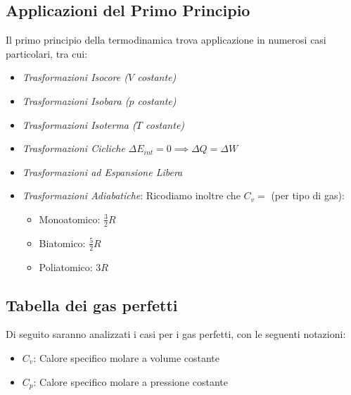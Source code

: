         \subsection*{Applicazioni del Primo Principio} Il primo principio della 
        termodinamica trova applicazione in numerosi casi particolari, tra cui:
            \begin{itemize}
                \item \textit{Trasformazioni Isocore ($V$ costante)}
                \item \textit{Trasformazioni Isobara ($p$ costante)}
                \item \textit{Trasformazioni Isoterma ($T$ costante)}
                \item \textit{Trasformazioni Cicliche}
                    $\Delta E_{int} = 0 \implies \Delta Q = \Delta W$
                \item \textit{Trasformazioni ad Espansione Libera}
                \item \textit{Trasformazioni Adiabatiche}: Ricodiamo 
                        inoltre che $C_v = $ (per tipo di gas):
                        \begin{itemize}
                            \item Monoatomico: $\frac{3}{2} R$
                            \item Biatomico: $\frac{5}{2} R$
                            \item Poliatomico: $3 R$
                        \end{itemize}
            \end{itemize}

        \subsection*{Tabella dei gas perfetti} Di seguito saranno analizzati i 
        casi per i gas perfetti, con le seguenti notazioni:
            \begin{itemize}
                \item $C_v$: Calore specifico molare a volume costante
                \item $C_p$: Calore specifico molare a pressione costante
            \end{itemize}

